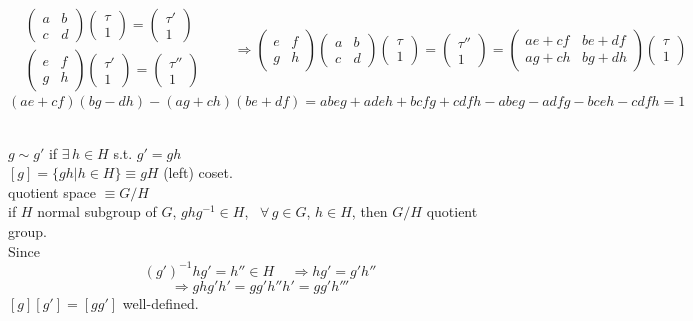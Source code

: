 \documentclass{book}
\begin{document}
\[
\begin{aligned}
  & \left( \begin{matrix} a & b \\ c & d \end{matrix} \right) \left( \begin{matrix} \tau \\ 1 \end{matrix} \right) = \left( \begin{matrix} \tau' \\ 1 \end{matrix} \right) \\ 
  & \left( \begin{matrix} e & f \\ g & h \end{matrix} \right) \left( \begin{matrix} \tau' \\ 1 \end{matrix} \right) = \left( \begin{matrix} \tau'' \\ 1 \end{matrix} \right) 
\end{aligned} \quad \quad \Longrightarrow \left( \begin{matrix} e & f \\ g & h \end{matrix} \right) \left( \begin{matrix} a & b \\ c & d \end{matrix} \right) \left( \begin{matrix} \tau \\ 1 \end{matrix} \right) = \left( \begin{matrix} \tau'' \\ 1 \end{matrix} \right) = \left( \begin{matrix} a e + cf & be + df \\ ag + ch & bg + d h \end{matrix} \right) \left( \begin{matrix} \tau \\ 1 \end{matrix} \right) 
\]
\[
(ae + cf) (bg - dh) - (ag+ch) (be +df) = abeg + adeh + bcfg + cdfh - abeg - adfg - bceh - cdfh = 1 
\]

\smallskip{} \\
$g \sim g'$ if $\exists \, h \in H$ s.t. $g' = gh$ \\
$[g] = \lbrace gh | h \in H \rbrace \equiv gH$ (left) coset. \\
quotient space $\equiv G/H$ \\
if $H$ normal subgroup of $G$, $ghg^{-1} \in H$, \, $\forall \, g \in G$, $h \in H$, then $G/H$ quotient group.  \\
Since
\[
(g')^{-1} h g' = h'' \in H \quad \, \Longrightarrow hg' = g'h''
\]
\[
\Longrightarrow ghg'h' = gg' h'' h' = gg'h'''
\]
$[g][g'] = [gg']$ well-defined.  \\
\end{document}
